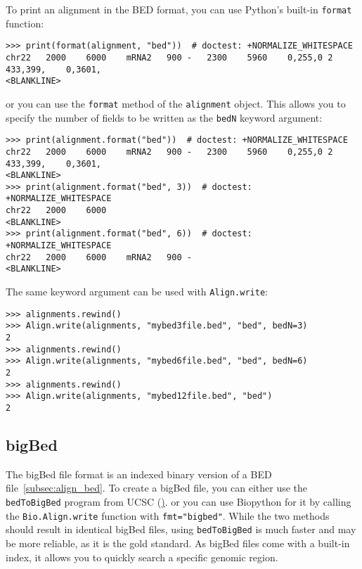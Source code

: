 To print an alignment in the BED format, you can use Python's built-in \verb|format| function:
\begin{verbatim}
>>> print(format(alignment, "bed"))  # doctest: +NORMALIZE_WHITESPACE
chr22	2000	6000	mRNA2	900	-	2300	5960	0,255,0	2	433,399,	0,3601,
<BLANKLINE>
\end{verbatim}
or you can use the \verb|format| method of the \verb|alignment| object. This allows you to specify the number of fields to be written as the \verb|bedN| keyword argument:
\begin{verbatim}
>>> print(alignment.format("bed"))  # doctest: +NORMALIZE_WHITESPACE
chr22	2000	6000	mRNA2	900	-	2300	5960	0,255,0	2	433,399,	0,3601,
<BLANKLINE>
>>> print(alignment.format("bed", 3))  # doctest: +NORMALIZE_WHITESPACE
chr22	2000	6000
<BLANKLINE>
>>> print(alignment.format("bed", 6))  # doctest: +NORMALIZE_WHITESPACE
chr22	2000	6000	mRNA2	900	-
<BLANKLINE>
\end{verbatim}
The same keyword argument can be used with \verb|Align.write|:
\begin{verbatim}
>>> alignments.rewind()
>>> Align.write(alignments, "mybed3file.bed", "bed", bedN=3)
2
>>> alignments.rewind()
>>> Align.write(alignments, "mybed6file.bed", "bed", bedN=6)
2
>>> alignments.rewind()
>>> Align.write(alignments, "mybed12file.bed", "bed")
2
\end{verbatim}


\subsection{bigBed}
\label{subsec:align_bigbed}

The bigBed file format is an indexed binary version of a BED file~\ref{subsec:align_bed}. To create a bigBed file, you can either use the \verb+bedToBigBed+ program from UCSC (\href{https://genome.ucsc.edu/goldenPath/help/bigBed.html}). or you can use Biopython for it by calling the \verb|Bio.Align.write| function with \verb|fmt="bigbed"|. While the two methods should result in identical bigBed files, using \verb+bedToBigBed+ is much faster and may be more reliable, as it is the gold standard. As bigBed files come with a built-in index, it allows you to quickly search a specific genomic region.

